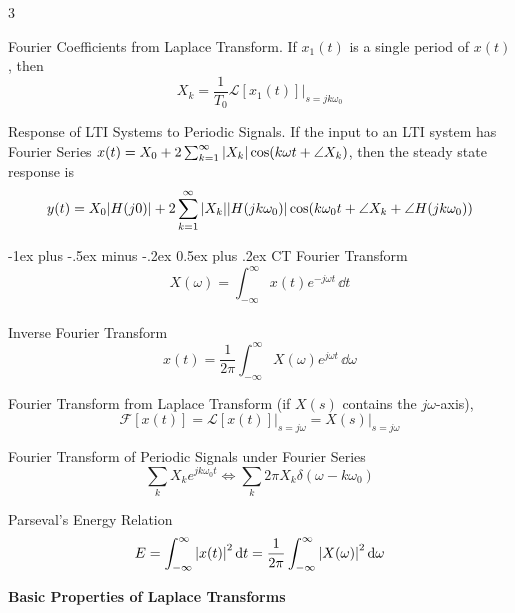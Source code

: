 \documentclass[10pt,landscape]{article}
\makeatletter
\renewcommand{\section}{\@startsection{section}{1}{0mm}%
        {-1ex plus -.5ex minus -.2ex}%
            {0.5ex plus .2ex}%
                {\normalfont\large\bfseries}}
\makeatother
\begin{document}
\begin{multicols}{3}
    
    Fourier Coefficients from Laplace Transform. If $x_1(t)$ is a single period of $x(t)$, then
    \[X_k = \frac{1}{T_0}\mathcal{L}[x_1(t)] \big\rvert_{s = jk\omega_0}\]
    
    Response of LTI Systems to Periodic Signals. If the input to an LTI system has Fourier Series $x(t) = X_0 + 2\sum_{k=1}^{\infty}\abs{X_k}\cos(k\omega t + \angle X_k)$, then the steady state response is 
    \[ y(t) = X_0\abs{H(j0)} + 2\sum_{k=1}^{\infty}\abs{X_k}\abs{H(jk\omega_0)}\cos(k\omega_0 t + \angle X_k + \angle H(jk\omega_0))\]
    
    \section{CT Fourier Transform}
    \[X(\omega) = \int_{-\infty}^{\infty}x(t)e^{-j\omega t}\,\dd t\]\\
    Inverse Fourier Transform 
    \[x(t) = \frac{1}{2\pi}\int_{-\infty}^{\infty}X(\omega)e^{j\omega t}\,\dd\omega\]
    
    Fourier Transform from Laplace Transform (if $X(s)$ contains the $j\omega$-axis),
    \[\mathcal{F}[x(t)] = \mathcal{L}[x(t)]\big\rvert_{s = j\omega} = X(s)\big\rvert_{s = j\omega}\]
    
    Fourier Transform of Periodic Signals under Fourier Series\\
    \[ \sum_k X_k e^{jk\omega_0 t} \Leftrightarrow \sum_k 2\pi X_k \delta(\omega - k\omega_0)\]
    
    Parseval's Energy Relation
    \[ E = \int_{-\infty}^{\infty} \abs{x(t)}^2\,\dd t = \frac{1}{2\pi}\int_{-\infty}^{\infty}\abs{X(\omega)}^2\,\dd\omega\]

    \vspace{12pt}

    
    \textbf{\normalsize  Basic Properties of Laplace Transforms}
\end{multicols}
\end{document}
